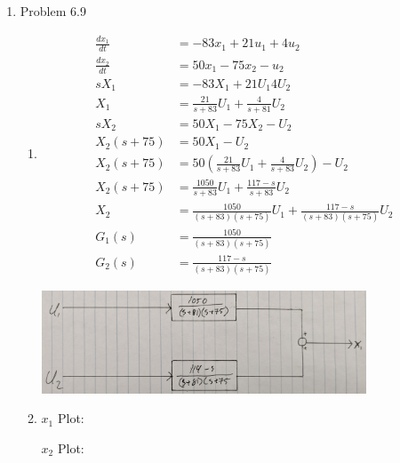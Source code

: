 \documentclass[12pt]{article}
\begin{document}
\begin{enumerate}
\begin{enumerate}
    \begin{center}
        
    \end{center}
\end{enumerate}


\newpage
\item Problem 6.9
    \begin{enumerate}
        \item 
        \begin{align*}
            \frac{dx_1}{dt} &= -83x_1 + 21u_1 + 4u_2 \\  
            \frac{dx_2}{dt} &= 50x_1 - 75x_2 - u_2 \\
            sX_1 &= -83X_1 + 21U_1 4U_2 \\
            X_1 &= \frac{21}{s+83} U_1 + \frac{4}{s+81} U_2 \\
            sX_2 &= 50X_1 - 75X_2 - U_2 \\
            X_2 (s+75) &= 50X_1 - U_2 \\
            X_2 (s+75) &= 50\left(\frac{21}{s+83} U_1 + \frac{4}{s+83} U_2\right) - U_2 \\
            X_2 (s+75) &= \frac{1050}{s+83} U_1 + \frac{117-s}{s+83} U_2 \\
            X_2 &= \frac{1050}{\left(s+83\right)\left(s+75\right)} U_1 + \frac{117-s}{\left(s+83\right)\left(s+75\right)} U_2 \\
            G_1(s) &= \frac{1050}{\left(s+83\right)\left(s+75\right)} \\
            G_2(s) &= \frac{117-s}{\left(s+83\right)\left(s+75\right)}
        \end{align*}

        \begin{center}
            \includegraphics[width=0.8\textwidth]{assets/block_diagram.jpg}
        \end{center}
        \item 
        
        $x_1$ Plot:

        

        $x_2$ Plot:
        
        
    \end{enumerate}


\end{enumerate}
\end{document}
